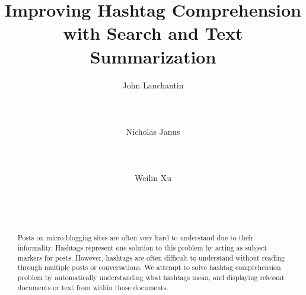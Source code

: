 \documentclass{sig-alternate}
\begin{document}
%

\title{Improving Hashtag Comprehension with Search and Text Summarization
}

\author{
\alignauthor
John Lanchantin\\
       \\
       \\
       \\
\alignauthor
Nicholas Janus\\
       \\
       \\
       \\
\alignauthor 
Weilin Xu\\
       \\
       \\
       \\
}

\maketitle
\begin{abstract}
Posts on micro-blogging sites are often very hard to understand due to their informality. Hashtags represent one solution to this problem by acting as subject markers for posts. However, hashtags are often difficult to understand without reading through multiple posts or conversations. We attempt to solve hashtag comprehension problem by automatically understanding what hashtags mean, and displaying relevant documents or text from within those documents.
\end{abstract}

\end{document}
